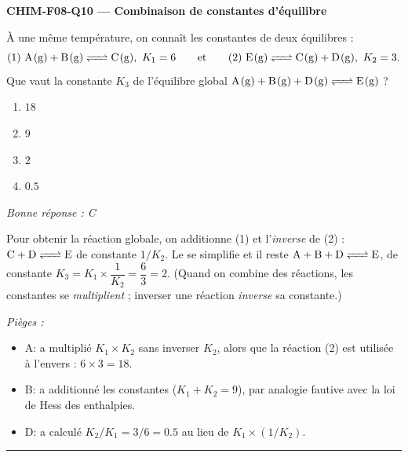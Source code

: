 \documentclass[11pt,a4paper]{article}
\begin{document}
\noindent\textbf{CHIM-F08-Q10 --- Combinaison de constantes d'équilibre}\par
À une même température, on connaît les constantes de deux équilibres :
\[ (1)\ \ce{A(g) + B(g) <=> C(g)},\ K_1=6 \qquad\text{et}\qquad (2)\ \ce{E(g) <=> C(g) + D(g)},\ K_2=3. \]
Que vaut la constante $K_3$ de l'équilibre global $\ce{A(g) + B(g) + D(g) <=> E(g)}$ ?
\begin{enumerate}[label=\Alph*)]
\item $18$
\item $9$
\item $2$
\item $\num{0.5}$
\end{enumerate}
\textit{Bonne réponse : C}\par
Pour obtenir la réaction globale, on additionne (1) et l'\emph{inverse} de (2) : $\ce{C + D <=> E}$ de constante $1/K_2$. Le  se simplifie et il reste $\ce{A + B + D <=> E}$, de constante $K_3=K_1\times\dfrac{1}{K_2}=\dfrac{6}{3}=2$. (Quand on combine des réactions, les constantes se \emph{multiplient} ; inverser une réaction \emph{inverse} sa constante.)\par
\textit{Pièges :}
\begin{itemize}
\item A: a multiplié $K_1\times K_2$ sans inverser $K_2$, alors que la réaction (2) est utilisée à l'envers : $6\times3=18$.
\item B: a additionné les constantes ($K_1+K_2=9$), par analogie fautive avec la loi de Hess des enthalpies.
\item D: a calculé $K_2/K_1=3/6=\num{0.5}$ au lieu de $K_1\times(1/K_2)$.
\end{itemize}
\vspace{8pt}\hrule\vspace{8pt}
\end{document}
